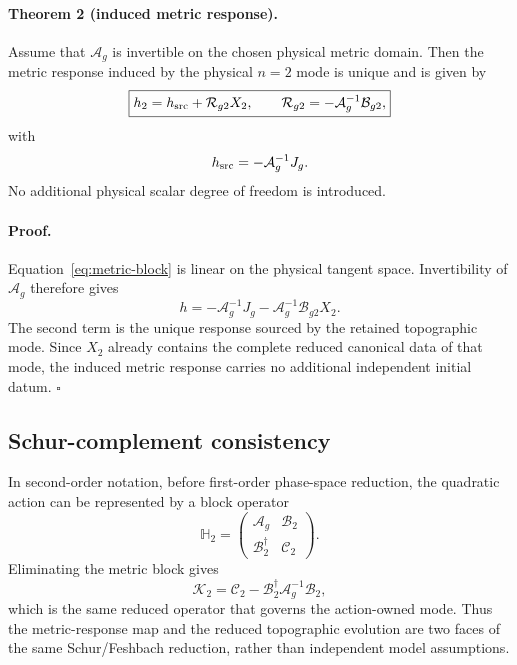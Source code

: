 \paragraph{Theorem 2 (induced metric response).}
Assume that $\mathcal A_g$ is invertible on the chosen physical metric domain.
Then the metric response induced by the physical $n=2$ mode is unique and is
given by
\begin{equation}
\boxed{
h_2
=
h_{\rm src}
+
\mathcal R_{g2}X_2,
\qquad
\mathcal R_{g2}
=
-\mathcal A_g^{-1}\mathcal B_{g2},
}
\label{eq:metric-response-map}
\end{equation}
with
\begin{equation}
h_{\rm src}=-\mathcal A_g^{-1}J_g.
\end{equation}
No additional physical scalar degree of freedom is introduced.

\paragraph{Proof.}
Equation~\eqref{eq:metric-block} is linear on the physical tangent space.
Invertibility of $\mathcal A_g$ therefore gives
\[
h
=
-\mathcal A_g^{-1}J_g
-
\mathcal A_g^{-1}\mathcal B_{g2}X_2.
\]
The second term is the unique response sourced by the retained topographic
mode.  Since $X_2$ already contains the complete reduced canonical data of
that mode, the induced metric response carries no additional independent
initial datum. \hfill$\square$

\subsection{Schur-complement consistency}

In second-order notation, before first-order phase-space reduction, the
quadratic action can be represented by a block operator
\begin{equation}
\mathbb H_2
=
\begin{pmatrix}
\mathcal A_g & \mathcal B_2\\
\mathcal B_2^\dagger & \mathcal C_2
\end{pmatrix}.
\end{equation}
Eliminating the metric block gives
\begin{equation}
\boxed{
\mathcal K_2
=
\mathcal C_2
-
\mathcal B_2^\dagger
\mathcal A_g^{-1}
\mathcal B_2 ,
}
\label{eq:metric-schur}
\end{equation}
which is the same reduced operator that governs the action-owned mode.
Thus the metric-response map and the reduced topographic evolution are two
faces of the same Schur/Feshbach reduction, rather than independent model
assumptions.

